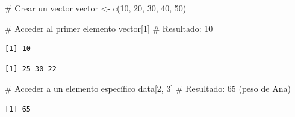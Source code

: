 \documentclass[
  spanish,
  a4paper,
  DIV=11,
  numbers=noendperiod,
  onepage,
  openany]{scrreprt}
\newenvironment{Shaded}{\begin{snugshade}}{\end{snugshade}}
\newcommand{\AttributeTok}[1]{\textcolor[rgb]{0.40,0.45,0.13}{#1}}
\newcommand{\CommentTok}[1]{\textcolor[rgb]{0.37,0.37,0.37}{#1}}
\newcommand{\DecValTok}[1]{\textcolor[rgb]{0.68,0.00,0.00}{#1}}
\newcommand{\FunctionTok}[1]{\textcolor[rgb]{0.28,0.35,0.67}{#1}}
\newcommand{\NormalTok}[1]{\textcolor[rgb]{0.00,0.23,0.31}{#1}}
\newcommand{\OtherTok}[1]{\textcolor[rgb]{0.00,0.23,0.31}{#1}}
\newcommand{\SpecialCharTok}[1]{\textcolor[rgb]{0.37,0.37,0.37}{#1}}
\newcommand{\StringTok}[1]{\textcolor[rgb]{0.13,0.47,0.30}{#1}}
\begin{document}
\begin{Shaded}
\begin{Highlighting}[]
\CommentTok{\# Crear un vector}
\NormalTok{vector }\OtherTok{\textless{}{-}} \FunctionTok{c}\NormalTok{(}\DecValTok{10}\NormalTok{, }\DecValTok{20}\NormalTok{, }\DecValTok{30}\NormalTok{, }\DecValTok{40}\NormalTok{, }\DecValTok{50}\NormalTok{)}

\CommentTok{\# Acceder al primer elemento}
\NormalTok{vector[}\DecValTok{1}\NormalTok{]       }\CommentTok{\# Resultado: 10}
\end{Highlighting}
\end{Shaded}

\begin{verbatim}
[1] 10
\end{verbatim}

\begin{Shaded}
\end{Shaded}

\begin{verbatim}
[1] 25 30 22
\end{verbatim}

\begin{Shaded}
\begin{Highlighting}[]
\CommentTok{\# Acceder a un elemento específico}
\NormalTok{data[}\DecValTok{2}\NormalTok{, }\DecValTok{3}\NormalTok{]     }\CommentTok{\# Resultado: 65 (peso de Ana)}
\end{Highlighting}
\end{Shaded}

\begin{verbatim}
[1] 65
\end{verbatim}
\end{document}
